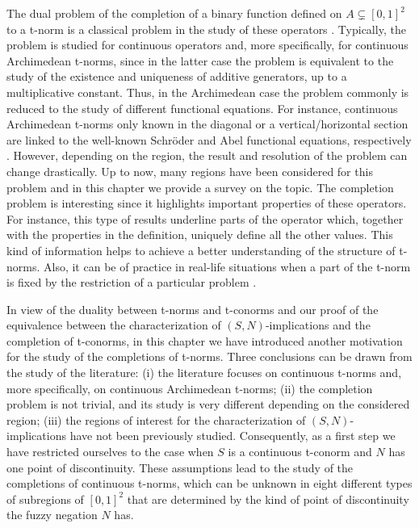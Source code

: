 The dual problem of the completion of a binary function defined on $A\subsetneq [0,1]^2$ to a t-norm is a classical problem in the study of these operators \cite{Kimberling1973}. Typically, the problem is studied for continuous operators and, more specifically, for continuous Archimedean t-norms, since in the latter case the problem is equivalent to the study of the existence and uniqueness of additive generators, up to a multiplicative constant. Thus, in the Archimedean case the problem commonly is reduced to the study of different functional equations. For instance, continuous Archimedean t-norms only known in the diagonal or a vertical/horizontal section are linked to the well-known Schröder and Abel functional equations, respectively \cite{Alsina2006}. However, depending on the region, the result and resolution of the problem can change drastically. Up to now, many regions have been considered for this problem \cite{Alsina2006,Bezivin1993,Darsow1983,Jenei2005,Kimberling1973,Klement1999,Mesiar1999,Mesiarova2017} and in this chapter we provide a survey on the topic. The completion problem is interesting since it highlights important properties of these operators. For instance, this type of results underline parts of the operator which, together with the properties in the definition, uniquely define all the other values. This kind of information helps to achieve a better understanding of the structure of t-norms. Also, it can be of practice in real-life situations when a part of the t-norm is fixed by the restriction of a particular problem \cite{Mesiarova2017}.

In view of the duality between t-norms and t-conorms and our proof of the equivalence between the characterization of $(S,N)$-implications and the completion of t-conorms, in this chapter we have introduced another motivation for the study of the completions of t-norms. Three conclusions can be drawn from the study of the literature: (i) the literature focuses on continuous t-norms and, more specifically, on continuous Archimedean t-norms; (ii) the completion problem is not trivial, and its study is very different depending on the considered region; (iii) the regions of interest for the characterization of $(S,N)$-implications have not been previously studied. Consequently, as a first step we have restricted ourselves to the case when $S$ is a continuous t-conorm and $N$ has one point of discontinuity. These assumptions lead to the study of the completions of continuous t-norms, which can be unknown in eight different types of subregions of $[0,1]^2$ that are determined by the kind of point of discontinuity the fuzzy negation $N$ has.

